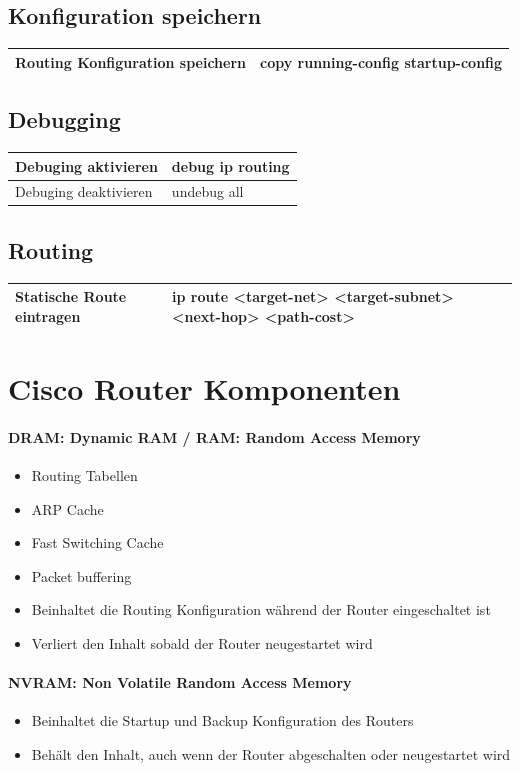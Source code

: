 \subsection{Konfiguration speichern}
\begin{tabu} to \linewidth {|X|X|}
	\hline
	Routing Konfiguration speichern & copy running-config startup-config \\ 
	\hline
\end{tabu}

\subsection{Debugging}
\begin{tabu} to \linewidth {|X|X|}
	\hline
	Debuging aktivieren & debug ip routing \\ 
	\hline
	Debuging deaktivieren & undebug all \\ 
	\hline
\end{tabu}

\subsection{Routing}
\begin{tabu} to \linewidth {|X|X|}
	\hline
	Statische Route eintragen 	& ip route <target-net> <target-subnet> <next-hop> <path-cost>\\ 
	\hline
\end{tabu}

\section{Cisco Router Komponenten}
\paragraph{DRAM: Dynamic RAM / RAM: Random Access Memory}
\begin{itemize}
	\item Routing Tabellen
	\item ARP Cache
	\item Fast Switching Cache
	\item Packet buffering
	\item Beinhaltet die Routing Konfiguration während der Router eingeschaltet ist
	\item Verliert den Inhalt sobald der Router neugestartet wird
\end{itemize}

\paragraph{NVRAM: Non Volatile Random Access Memory}
\begin{itemize}
	\item Beinhaltet die Startup und Backup Konfiguration des Routers
	\item Behält den Inhalt, auch wenn der Router abgeschalten oder neugestartet wird
\end{itemize}

